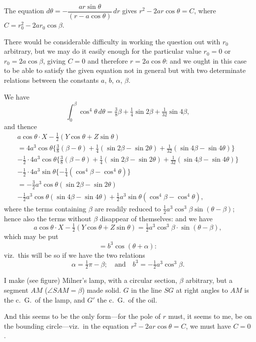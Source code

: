 \documentclass[11pt,a4paper]{article}
\begin{document}
The equation $d\theta = -\dfrac{ar\sin\theta}{(r-a\cos\theta)}\,dr$ gives $r^2 - 2ar\cos\theta = C$, where $C = r_0^2 - 2ar_0\cos\beta$.

There would be considerable difficulty in working the question out with $r_0$ arbitrary, but we may do it easily enough for the particular value $r_0 = 0$ or $r_0 = 2a\cos\beta$, giving $C = 0$ and therefore $r = 2a\cos\theta$: and we ought in this case to be able to satisfy the given equation not in general but with two determinate relations between the constants $a$, $b$, $\alpha$, $\beta$.

We have
\[
\int_0^\beta \cos^4\theta\,d\theta = \tfrac{3}{8}\beta + \tfrac{1}{4}\sin 2\beta + \tfrac{1}{32}\sin 4\beta,
\]
and thence
\begin{multline*}
a\cos\theta \cdot X - \tfrac{1}{2}(Y\cos\theta + Z\sin\theta) \\
= 4a^3\cos\theta\{\tfrac{3}{8}(\beta-\theta) + \tfrac{1}{4}(\sin 2\beta - \sin 2\theta) + \tfrac{1}{32}(\sin 4\beta - \sin 4\theta)\} \\
- \tfrac{1}{2} \cdot 4a^3\cos\theta\{\tfrac{3}{8}(\beta-\theta) + \tfrac{1}{4}(\sin 2\beta - \sin 2\theta) + \tfrac{1}{32}(\sin 4\beta - \sin 4\theta)\} \\
- \tfrac{1}{2} \cdot 4a^3\sin\theta\{-\tfrac{1}{4}(\cos^4\beta - \cos^4\theta)\} \\
= -\tfrac{3}{2}a^3\cos\theta(\sin 2\beta - \sin 2\theta) \\
-\tfrac{1}{2}a^3\cos\theta(\sin 4\beta - \sin 4\theta) + \tfrac{1}{2}a^3\sin\theta(\cos^4\beta - \cos^4\theta),
\end{multline*}
where the terms containing $\beta$ are readily reduced to $\tfrac{1}{2}a^3\cos^3\beta \sin(\theta-\beta)$; hence also the terms without $\beta$ disappear of themselves: and we have
\[
a\cos\theta \cdot X - \tfrac{1}{2}(Y\cos\theta + Z\sin\theta) = \tfrac{1}{2}a^3\cos^3\beta \cdot \sin(\theta - \beta),
\]
which may be put
\[
= b^3\cos(\theta + \alpha):
\]
viz.\ this will be so if we have the two relations
\[
\alpha = \tfrac{1}{2}\pi - \beta;\quad \text{and}\quad b^3 = -\tfrac{1}{2}a^3\cos^3\beta.
\]

I make (see figure) Milner's lamp, with a circular section, $\beta$ arbitrary, but a segment $AM$ ($\angle SAM = \beta$) made solid. $G$ in the line $SG$ at right angles to $AM$ is the c.\ G.\ of the lamp, and $G'$ the c.\ G.\ of the oil.

And this seems to be the only form---for the pole of $r$ must, it seems to me, be on the bounding circle---viz.\ in the equation $r^2 - 2ar\cos\theta = C$, we must have $C=0$.
\end{document}
